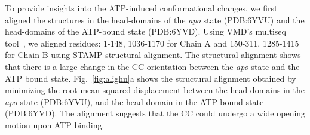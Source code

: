 \documentclass[aps,preprint]{revtex4-1}
\begin{document}


To provide insights into the ATP-induced conformational changes, we first aligned the structures in the head-domains of the {\it apo} state (PDB:6YVU) and the head-domains of the ATP-bound state (PDB:6YVD). Using VMD's multiseq tool~\cite{roberts2006multiseq}, we aligned residues: 1-148, 1036-1170 for Chain A and 150-311, 1285-1415 for Chain B using STAMP structural alignment.
The structural alignment shows that there is a large change in the  CC orientation between the {\it apo} state and the ATP bound state. %
Fig.~\ref{fig:alighn}a  shows the structural alignment obtained by minimizing the root mean squared displacement between the head domains in the {\it apo} state (PDB:6YVU), and the head domain in the ATP bound state (PDB:6YVD). The alignment suggests that the CC could undergo a wide opening motion upon ATP binding. %

\end{document}

